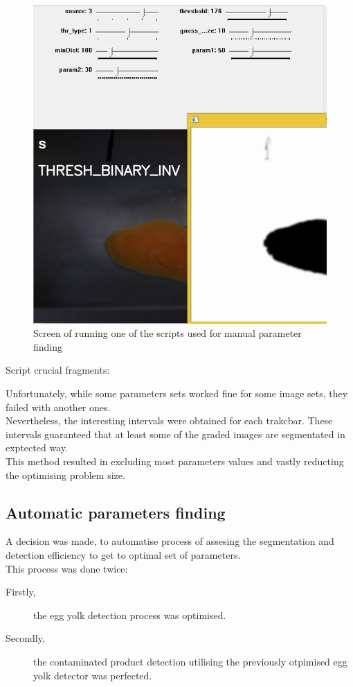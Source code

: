 \documentclass[12pt,twoside,a4paper]{article}
\begin{document}
\begin{figure}[H]
\centering
\includegraphics[width=0.5\paperwidth]{manual}
\caption{Screen of running one of the scripts used for manual parameter finding}
\end{figure}

Script crucial fragments:



Unfortunately, while some parameters sets worked fine for some image sets, they failed with another ones.\\
Nevertheless, the interesting intervals were obtained for each trakcbar. These intervals guaranteed that at least some of the graded images are segmentated in exptected way.\\
This method resulted in excluding most parameters values and vastly reducting the optimising problem size.

\subsection{Automatic parameters finding}

A decision was made, to automatise process of assesing the segmentation and detection efficiency to get to optimal set of parameters.\\
This process was done twice:\\
\begin{description}
\item[Firstly,] the egg yolk detection process was optimised.
\item[Secondly,] the contaminated product detection utilising the previously otpimised egg yolk detector was perfected.
\end{description}
\end{document}
